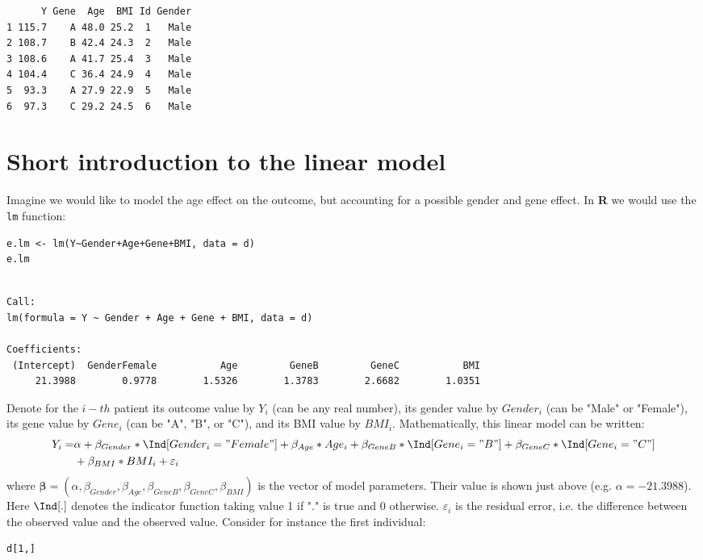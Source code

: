 \documentclass[12pt]{article}
\newcommand\Rlogo{\textbf{\textsf{R}}\xspace} %
\begin{document}
\begin{verbatim}
      Y Gene  Age  BMI Id Gender
1 115.7    A 48.0 25.2  1   Male
2 108.7    B 42.4 24.3  2   Male
3 108.6    A 41.7 25.4  3   Male
4 104.4    C 36.4 24.9  4   Male
5  93.3    A 27.9 22.9  5   Male
6  97.3    C 29.2 24.5  6   Male
\end{verbatim}

\clearpage

\section{Short introduction to the linear model}
\label{sec:org85783f1}

Imagine we would like to model the age effect on the outcome, but
accounting for a possible gender and gene effect. In \Rlogo{} we would
use the \texttt{lm} function:
\lstset{language=r,label= ,caption= ,captionpos=b,numbers=none}
\begin{lstlisting}
e.lm <- lm(Y~Gender+Age+Gene+BMI, data = d)
e.lm
\end{lstlisting}

\begin{verbatim}

Call:
lm(formula = Y ~ Gender + Age + Gene + BMI, data = d)

Coefficients:
 (Intercept)  GenderFemale           Age         GeneB         GeneC           BMI  
     21.3988        0.9778        1.5326        1.3783        2.6682        1.0351
\end{verbatim}

Denote for the \(i-th\) patient its outcome value by \(Y_i\) (can be
any real number), its gender value by \(Gender_i\) (can be "Male" or
"Female"), its gene value by \(Gene_i\) (can be "A", "B", or
"C"), and its BMI value by \(BMI_i\). Mathematically, this linear model can be written:
\begin{align*}
Y_i =& \alpha + \beta_{Gender} * \Ind[Gender_i="Female"] + \beta_{Age} * Age_i + \beta_{GeneB} *  \Ind[Gene_i="B"] + \beta_{GeneC} * \Ind[Gene_i="C"] \\
& + \beta_{BMI} * BMI_i + \varepsilon_i
\end{align*}
where \(\boldsymbol{\beta} =
(\alpha,\beta_{Gender},\beta_{Age},\beta_{GeneB},\beta_{GeneC},\beta_{BMI})\) is
the vector of model parameters. Their value is shown just above
(e.g. \(\alpha=-21.3988\)). Here \(\Ind[.]\) denotes the indicator
function taking value 1 if "." is true and 0
otherwise. \(\varepsilon_i\) is the residual error, i.e. the
difference between the observed value and the observed value. Consider
for instance the first individual:
\lstset{language=r,label= ,caption= ,captionpos=b,numbers=none}
\begin{lstlisting}
d[1,]
\end{lstlisting}
\end{document}
